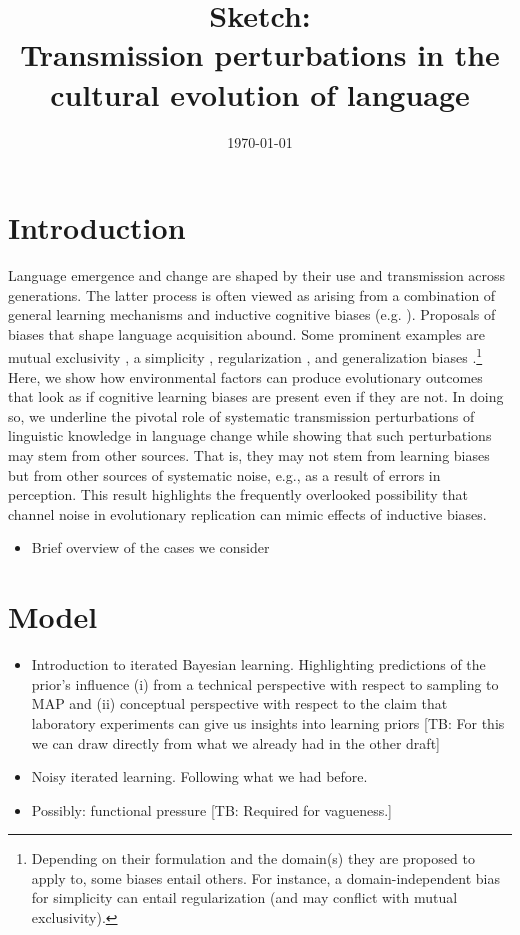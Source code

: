 \documentclass[11pt]{article}
\title{Sketch:\\Transmission perturbations in the cultural evolution of language}
\author{%
    \today
}
\date{}
\newcommand{\tb}[1]{\textcolor[rgb]{.8,.33,.0}{[TB: #1]}}%
\begin{document}
\maketitle

\section{Introduction}
Language emergence and change are shaped by their use and transmission across generations. The latter process is often viewed as arising from a combination of general learning mechanisms and inductive cognitive biases (e.g. \citealt{griffiths+kalish:2007,kirby+etal:2014,tamariz+kirby:2016}).  Proposals of biases that shape language acquisition abound. Some prominent examples are mutual exclusivity \citep{merriman+bowman:1989,clark:2009}, a simplicity \citep{kirby+etal:2015}, regularization \citep{hudson+etal:2005}, and generalization biases \citep{smith:2011,oconnor:2015}.\footnote{Depending on their formulation and the domain(s) they are proposed to apply to, some biases entail others. For instance, a domain-independent bias for simplicity can entail regularization (and may conflict with mutual exclusivity).} Here, we show how environmental factors can produce evolutionary outcomes that look as if cognitive learning biases are present even if they are not. In doing so, we underline the pivotal role of systematic transmission perturbations of linguistic knowledge in language change while showing that such perturbations may stem from other sources. That is, they may not stem from learning biases but from other sources of systematic noise, e.g., as a result of errors in perception. This result highlights the frequently overlooked possibility that channel noise in evolutionary replication can mimic effects of inductive biases.

\begin{itemize}
  \item Brief overview of the cases we consider
\end{itemize}


\section{Model}

\begin{itemize}
  \item Introduction to iterated Bayesian learning. Highlighting predictions of the prior's influence (i) from a technical perspective with respect to sampling to MAP and (ii) conceptual perspective with respect to the claim that laboratory experiments can give us insights into learning priors \tb{For this we can draw directly from what we already had in the other draft}
  \item Noisy iterated learning. Following what we had before.
  \item Possibly: functional pressure \tb{Required for vagueness.}
\end{itemize}
\end{document}
